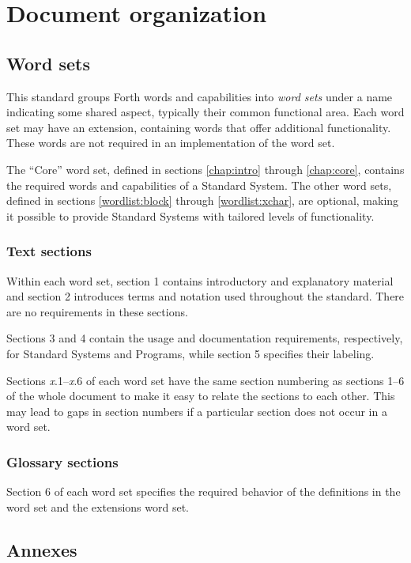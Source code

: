 \section{Document organization}
\label{intro:wordsets}

\subsection{Word sets}
This standard groups Forth words and capabilities into \emph{word sets}
under a name indicating some shared aspect, typically their common
functional area. Each word set may have an extension, containing words
that offer additional functionality. These words are not required in an
implementation of the word set.

The ``Core'' word set, defined in sections \ref{chap:intro} through \ref{chap:core}, contains the
required words and capabilities of a Standard System. The other word
sets, defined in sections \ref{wordlist:block} through
\ref{wordlist:xchar}, are optional, making it possible to provide
Standard Systems with tailored levels of functionality.

\subsubsection{Text sections}
\label{intro:numbering}

Within each word set, section 1 contains introductory and explanatory
material and section 2 introduces terms and notation used throughout
the standard. There are no requirements in these sections.

Sections 3 and 4 contain the usage and documentation requirements,
respectively, for Standard Systems and Programs, while section 5
specifies their labeling.

Sections \emph{x}.1--\emph{x}.6 of each word set have the same section
numbering as sections 1--6 of the whole document to make it easy to
relate the sections to each other.  This may lead to gaps in section
numbers if a particular section does not occur in a word set.

\subsubsection{Glossary sections}

Section 6 of each word set specifies the required behavior of the
definitions in the word set and the extensions word set.

\subsection{Annexes}
\label{intro:annex}

